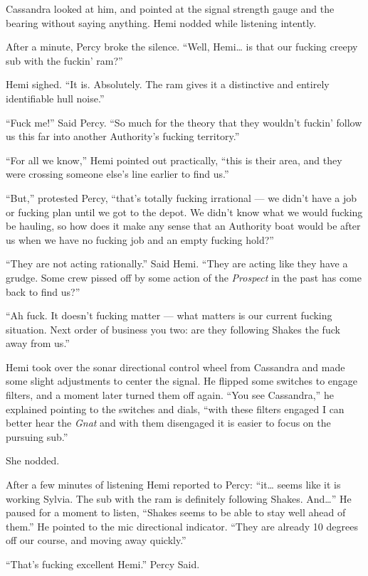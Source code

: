 \documentclass[
]{scrbook}
\begin{document}
Cassandra looked at him, and pointed at the signal strength gauge and
the bearing without saying anything. Hemi nodded while listening
intently.

After a minute, Percy broke the silence. ``Well, Hemi\ldots{} is that
our fucking creepy sub with the fuckin' ram?''

Hemi sighed. ``It is. Absolutely. The ram gives it a distinctive and
entirely identifiable hull noise.''

``Fuck me!'' Said Percy. ``So much for the theory that they wouldn't
fuckin' follow us this far into another Authority's fucking territory.''

``For all we know,'' Hemi pointed out practically, ``this is their area,
and they were crossing someone else's line earlier to find us.''

``But,'' protested Percy, ``that's totally fucking irrational --- we
didn't have a job or fucking plan until we got to the depot. We didn't
know what we would fucking be hauling, so how does it make any sense
that an Authority boat would be after us when we have no fucking job and
an empty fucking hold?''

``They are not acting rationally.'' Said Hemi. ``They are acting like
they have a grudge. Some crew pissed off by some action of the
\emph{Prospect} in the past has come back to find us?''

``Ah fuck. It doesn't fucking matter --- what matters is our current
fucking situation. Next order of business you two: are they following
Shakes the fuck away from us.''

Hemi took over the sonar directional control wheel from Cassandra and
made some slight adjustments to center the signal. He flipped some
switches to engage filters, and a moment later turned them off again.
``You see Cassandra,'' he explained pointing to the switches and dials,
``with these filters engaged I can better hear the \emph{Gnat} and with
them disengaged it is easier to focus on the pursuing sub.''

She nodded.

After a few minutes of listening Hemi reported to Percy: ``it\ldots{}
seems like it is working Sylvia. The sub with the ram is definitely
following Shakes. And\ldots{}'' He paused for a moment to listen,
``Shakes seems to be able to stay well ahead of them.'' He pointed to
the mic directional indicator. ``They are already 10 degrees off our
course, and moving away quickly.''

``That's fucking excellent Hemi.'' Percy Said.
\end{document}
